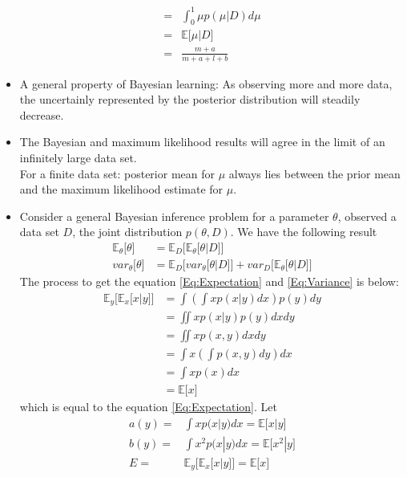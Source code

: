 \documentclass[12pt, a4paper]{article}
\newcommand{\E}{\mathbb{E}}
\begin{document}
\begin{itemize}
\begin{align*}
            =&\int_0^1\mu p(\mu|D)d\mu\\
            =&\E\lbrack \mu|D\rbrack\\
            =&\frac{m+a}{m+a+l+b}
        \end{align*}
        \item A general property of Bayesian learning: As observing more and more 
        data, the uncertainly represented by the posterior distribution will steadily 
        decrease.
        \item The Bayesian and maximum likelihood results will agree in the limit of 
        an infinitely large data set.\\
        For a finite data set: posterior mean for $\mu$ always lies between the prior 
        mean and the maximum likelihood estimate for $\mu$.
        \item Consider a general Bayesian inference problem for a parameter $\theta$, 
        observed a data set $D$, the joint distribution $p(\theta,D)$. We have the
        following result
        \begin{align}
            \label{Eq:Expectation}
            \E_\theta\lbrack\theta\rbrack&=\E_D\lbrack\E_\theta\lbrack\theta|D\rbrack
            \rbrack\\
            \label{Eq:Variance}
            var_\theta\lbrack\theta\rbrack&=\E_D\lbrack var_\theta\lbrack\theta|D
            \rbrack\rbrack+var_D\lbrack\E_\theta\lbrack\theta|D\rbrack\rbrack
        \end{align}
        The process to get the equation \ref{Eq:Expectation} and \ref{Eq:Variance} is 
        below:
        \begin{align*}
            \E_y\lbrack\E_x\lbrack x|y\rbrack\rbrack&=\int(\int xp(x|y)dx)p(y)dy\\
            &=\iint xp(x|y)p(y)dxdy\\
            &=\iint xp(x,y)dxdy\\
            &=\int x(\int p(x,y)dy)dx\\
            &=\int xp(x)dx\\
            &=\E\lbrack x\rbrack
        \end{align*}
        which is equal to the equation \ref{Eq:Expectation}. Let
        \begin{align*}
            a(y)=&\int xp(x|y)dx=\E\lbrack x|y\rbrack\\
            b(y)=&\int x^2p(x|y)dx=\E\lbrack x^2|y\rbrack\\
            E=&\E_y\lbrack\E_x\lbrack x|y\rbrack\rbrack=\E\lbrack x\rbrack

\end{align*}
\end{itemize}
\end{document}

